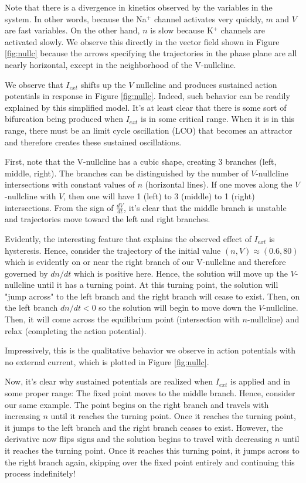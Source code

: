 \documentclass{article}
\begin{document}
Note that there is a divergence in kinetics observed by the variables in the system. In other words, because the Na$^+$ channel activates very quickly, $m$ and $V$ are fast variables. On the other hand, $n$ is slow because K$^+$ channels are activated slowly.\cite{keener} We observe this directly in the vector field shown in Figure \ref{fig:nullc} because the arrows specifying the trajectories in the phase plane are all nearly horizontal, except in the neighborhood of the V-nullcline.

We observe that $I_{ext}$ shifts up the $V$ nullcline and produces sustained action potentials in response in Figure \ref{fig:nullc}. Indeed, such behavior can be readily explained by this simplified model. It's at least clear that there is some sort of bifurcation being produced when $I_{ext}$ is in some critical range. When it is in this range, there must be an limit cycle oscillation (LCO) that becomes an attractor and therefore creates these sustained oscillations. 

First, note that the V-nullcline has a cubic shape, creating 3 branches (left, middle, right). The branches can be distinguished by the number of $V$-nullcline intersections with constant values of $n$ (horizontal lines). If one moves along the $V$-nullcline with $V$, then one will have 1 (left) to 3 (middle) to 1 (right) intersections. From the sign of $\frac{dV}{dt}$, it's clear that the middle branch is unstable and trajectories move toward the left and right branches.

Evidently, the interesting feature that explains the observed effect of $I_{ext}$ is hysteresis. Hence, consider the trajectory of the initial value $(n,V)\approx (0.6,80)$ which is evidently on or near the right branch of our V-nullcline and therefore governed by $dn/dt$ which is positive here. Hence, the solution will move up the $V$-nullcline until it has a turning point. At this turning point, the solution will "jump across" to the left branch and the right branch will cease to exist. Then, on the left branch $dn/dt<0$ so the solution will begin to move down the $V$-nullcline. Then, it will come across the equilibrium point (intersection with $n$-nullcline) and relax (completing the action potential).

Impressively, this is the qualitative behavior we observe in action potentials with no external current, which is plotted in Figure \ref{fig:nullc}.

Now, it's clear why sustained potentials are realized when $I_{ext}$ is applied and in some proper range: The fixed point moves to the middle branch. Hence, consider our same example. The point begins on the right branch and travels with increasing $n$ until it reaches the turning point. Once it reaches the turning point, it jumps to the left branch and the right branch ceases to exist. However, the derivative now flips signs and the solution begins to travel with decreasing $n$ until it reaches the turning point. Once it reaches this turning point, it jumps across to the right branch again, skipping over the fixed point entirely and continuing this process indefinitely!
\end{document}
